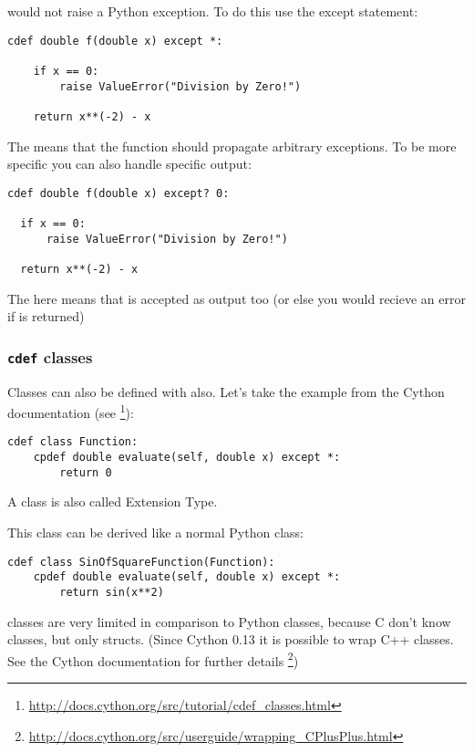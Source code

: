 \documentclass[letterpaper,10pt,english]{manual}
\begin{document}
would not raise a Python exception. To do this use the except
statement:

\begin{Verbatim}[commandchars=@\[\]]
cdef double f(double x) except *:

    if x == 0:
        raise ValueError("Division by Zero!")

    return x**(-2) - x
\end{Verbatim}

The \code{*} means that the function should propagate arbitrary
exceptions. To be more specific you can also handle specific output:

\begin{Verbatim}[commandchars=@\[\]]
cdef double f(double x) except? 0:

  if x == 0:
      raise ValueError("Division by Zero!")

  return x**(-2) - x
\end{Verbatim}

The  here means that  is accepted as output too (or else you
would recieve an error if  is returned)


\subsubsection{\texttt{cdef} classes}

Classes can also be defined with  also. Let's take the example
from the Cython documentation (see \footnote{
\href{http://docs.cython.org/src/tutorial/cdef\_classes.html}{http://docs.cython.org/src/tutorial/cdef\_classes.html}
}):

\begin{Verbatim}[commandchars=@\[\]]
cdef class Function:
    cpdef double evaluate(self, double x) except *:
        return 0
\end{Verbatim}

A  class is also called Extension Type.

This class can be derived like a normal Python class:

\begin{Verbatim}[commandchars=@\[\]]
cdef class SinOfSquareFunction(Function):
    cpdef double evaluate(self, double x) except *:
        return sin(x**2)
\end{Verbatim}

 classes are very limited in comparison to Python classes,
because C don't know classes, but only structs. (Since Cython 0.13 it
is possible to wrap C++ classes. See the Cython documentation for
further details \footnote{
\href{http://docs.cython.org/src/userguide/wrapping\_CPlusPlus.html}{http://docs.cython.org/src/userguide/wrapping\_CPlusPlus.html}
})
\end{document}
